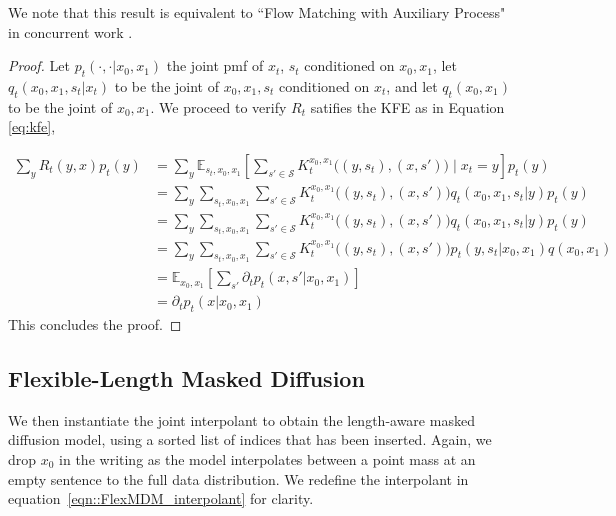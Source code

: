 We note that this result is equivalent to ``Flow Matching with Auxiliary Process" in concurrent work \cite{havasi2025edit}.
\begin{proof}
Let $p_t(\cdot, \cdot | x_0, x_1)$ the joint pmf of $x_t$, $s_t$ conditioned on $x_0, x_1$, let $q_t(x_0,x_1, s_t|x_t)$ to be the joint of $x_0,x_1,s_t$ conditioned on $x_t$, and let $q_t(x_0, x_1)$ to be the joint of $x_0, x_1$. We proceed to verify $R_t$ satifies the KFE as in Equation \ref{eq:kfe},

\begin{align*}
    \sum_{y} R_t(y, x) p_t(y) &= \sum_y \mathbb{E}_{s_t,x_0,x_1}\left[ \sum_{s' \in \mathcal{S}} K_t^{x_0, x_1} \big( (y, s_t), (x, s') \big) \mid x_t = y \right] p_t(y) \\
    &= \sum_y \sum_{s_t, x_0, x_1}  \sum_{s' \in \mathcal{S}} K_t^{x_0, x_1} \big( (y, s_t), (x, s') \big) q_t(x_0, x_1, s_t | y) p_t(y) \\
    &= \sum_y \sum_{s_t, x_0, x_1}  \sum_{s' \in \mathcal{S}} K_t^{x_0, x_1} \big( (y, s_t), (x, s') \big) q_t(x_0, x_1, s_t | y) p_t(y) \\
    &= \sum_y \sum_{s_t, x_0, x_1}  \sum_{s' \in \mathcal{S}} K_t^{x_0, x_1} \big( (y, s_t), (x, s') \big) p_t(y, s_t | x_0, x_1) q(x_0, x_1) \\
    &= \mathbb{E}_{x_0,x_1} \left[\sum_{s'}\partial_t p_t(x, s' | x_0, x_1)\right] \\
    &= \partial_t p_t(x | x_0, x_1)
\end{align*}
This concludes the proof.
\end{proof}

\subsection{Flexible-Length Masked Diffusion}
We then instantiate the joint interpolant to obtain the length-aware masked diffusion model, using a sorted list of indices that has been inserted. Again, we drop $x_0$ in the writing as the model interpolates between a point mass at an empty sentence to the full data distribution. We redefine the interpolant in equation~\ref{eqn::FlexMDM_interpolant} for clarity.

